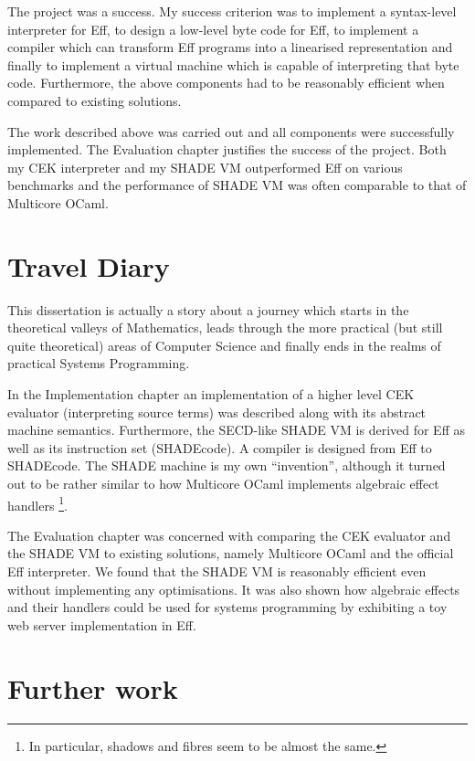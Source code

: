 \documentclass[class=article, crop=false]{standalone}
\begin{document}
The project was a success. My success criterion was to implement a 
syntax-level interpreter for Eff, to design a low-level byte code for Eff,
to implement a compiler which can transform Eff programs into a linearised
representation and finally to implement a virtual machine which is capable of
interpreting that byte code. Furthermore, the above components had to be
reasonably efficient when compared to existing solutions.

The work described above was carried out and all components were successfully
implemented. The Evaluation chapter justifies the success of the project.
Both my CEK interpreter and my SHADE VM outperformed Eff on various
benchmarks and the performance of SHADE VM was often comparable to that of
Multicore OCaml.

\section{Travel Diary}

This dissertation is actually a story about a journey
which starts in the theoretical valleys of Mathematics, leads through the more
practical (but still quite theoretical) areas of Computer Science and finally
ends in the realms of practical Systems Programming.

In the Implementation chapter an implementation of a higher level CEK evaluator
(interpreting source terms) was described along with its abstract machine
semantics. Furthermore, the SECD-like SHADE VM is derived for Eff as well as
its instruction set (SHADEcode). A compiler is designed from Eff to SHADEcode.
The SHADE machine is my own ``invention'', although it turned out to be rather
similar to how Multicore OCaml implements algebraic effect handlers
\footnote{In particular, shadows and fibres seem to be almost the same.}.

The Evaluation chapter was concerned with comparing the CEK evaluator and the
SHADE VM to existing solutions, namely Multicore OCaml and the official
Eff interpreter. We found that the SHADE VM is reasonably efficient even without
implementing any optimisations. It was also shown how algebraic effects and
their handlers could be used for systems programming by exhibiting a toy web
server implementation in Eff.

\section{Further work}
\end{document}
